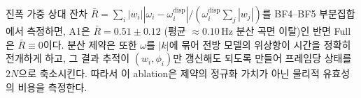 \documentclass[11pt]{report}
\numberwithin{equation}{chapter}
\numberwithin{figure}{chapter}
\numberwithin{table}{chapter}
\begin{document}
진폭 가중 상대 잔차 $\bar{R} = \sum_i |w_i||\omega_i - \omega_i^{\text{disp}}| / (\omega_i^{\text{disp}} \sum_j |w_j|)$를
BF4--BF5 부분집합에서 측정하면, A1은 $\bar{R} = 0.51 \pm 0.12$
(평균 $\approx 0.10$\,Hz 분산 곡면 이탈)인 반면
Full은 $\bar{R} \equiv 0$이다.
분산 제약은 또한 $\omega$를 $|k|$에 묶어 전방 모델의 위상항이 시간을 정확히 전개하게 하고,
그 결과 추적이 $(w_i, \phi_i)$만 갱신해도 되도록 만들어 프레임당 상태를 $2N$으로
축소시킨다.
따라서 이 ablation은 제약의 정규화 가치가 아닌 물리적 유효성의 비용을 측정한다.
\end{document}
